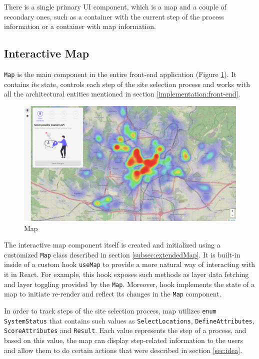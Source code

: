 There is a single primary UI component, which is a map and a couple of secondary ones, such as a container with the current step of the process information or a container with map information.

\subsection{Interactive Map}

\texttt{Map} is the main component in the entire front-end application (Figure \ref{fig:ui-map}). It contains its state, controls each step of the site selection process and works with all the architectural entities mentioned in section \ref{implementation:front-end}.

\begin{figure}[ht]\centering
  \centering
  \includegraphics[width=1\linewidth]{obrazky-figures/ch6/map.png}
  \caption{Map}
  \label{fig:ui-map}
\end{figure}

The interactive map component itself is created and initialized using a customized \texttt{Map} class described in section \ref{subsec:extendedMap}. It is built-in inside of a custom hook \texttt{useMap} to provide a more natural way of interacting with it in React. For example, this hook exposes such methods as layer data fetching and layer toggling provided by the \texttt{Map}. Moreover, hook implements the state of a map to initiate re-render and reflect its changes in the \texttt{Map} component.

In order to track steps of the site selection process, map utilizes \texttt{enum SystemStatus} that contains such values as \texttt{SelectLocations}, \texttt{DefineAttributes}, \texttt{ScoreAttributes} and \texttt{Result}. Each value represents the step of a process, and based on this value, the map can display step-related information to the users and allow them to do certain actions that were described in section \ref{sec:idea}. 


